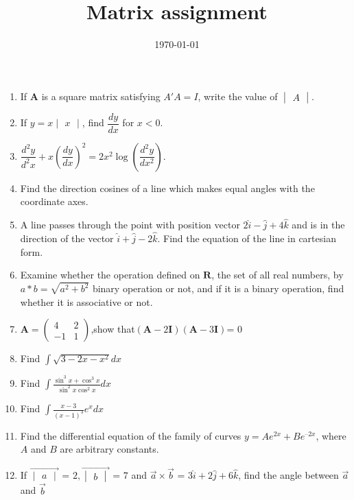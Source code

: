 \documentclass[12pt,-letter paper]{article}
\title{Matrix assignment}
\date{\today}
\providecommand{\brak}[1]{\ensuremath{\left(#1\right)}}
\theoremstyle{remark}
\newcommand{\myvec}[1]{\ensuremath{\begin{pmatrix}#1\end{pmatrix}}}
\newcommand{\mydet}[1]{\ensuremath{\begin{vmatrix}#1\end{vmatrix}}}
\let\vec\mathbf
\begin{document}
\begin{enumerate}
\item If $\vec{A}$ is a square matrix satisfying $A'A = I$, write the value of $\mydet{A}$.
   
\item If $y=x\mydet{x}$, find $\dfrac{dy}{dx}$ for $x < 0$.
        
 \item $\dfrac{d^2y}{d^2x}+x\brak{\dfrac{dy}{dx}}^2=2x^2\log\brak{\dfrac{d^2y}{dx^2}}$.
 
 \item Find the direction cosines of a line which makes equal angles with the coordinate axes.
 
 \item A line passes through the point with position vector $2\hat{i}-\hat{j}+4\hat{k}$ and is in the direction of the vector $\hat{i}+\hat{j}-2\hat{k}$. Find the equation of the line in cartesian form.
 
 \item Examine whether the operation defined on $\vec{R}$, the set of all real numbers, by $a * b = \sqrt{a^2+b^2}$ binary operation or not, and if it is a binary operation, find whether it is associative or not.
 
\item $\vec{A}= \myvec{4&2\\-1& 1}$,show that\brak{\vec{A}-2\vec{I}}\brak{\vec{A}-3\vec{I}}= $0$

\item Find $\int\sqrt{3-2x-x^2}dx$

\item Find $\int{\frac{\sin^3{x}+\cos^3{x}}{\sin^2{x}\cos^2{x}}}dx$

\item Find $\int{\frac{x-3}{\brak{x-1}^3}}e^x dx$

\item Find the differential equation of the family of curves ${y} = Ae^{2x} + Be^{–2x}$, where $A$ and $B$ are arbitrary constants.

\item If ${\overrightarrow{\mydet{a}}}$ = $2, {\overrightarrow{\mydet{b}}}$ = $7$ and $\overrightarrow{a}\times\overrightarrow{b}$ = $3\hat{i}+2\hat{j}+6\hat{k}$, find the angle between $\overrightarrow{a}$ and $\overrightarrow{b}$


\end{enumerate}
\end{document}
